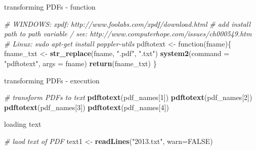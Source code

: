 \documentclass[ignorenonframetext,]{beamer}
\newenvironment{Shaded}{\begin{snugshade}}{\end{snugshade}}
\newcommand{\KeywordTok}[1]{\textcolor[rgb]{0.13,0.29,0.53}{\textbf{{#1}}}}
\newcommand{\DataTypeTok}[1]{\textcolor[rgb]{0.13,0.29,0.53}{{#1}}}
\newcommand{\DecValTok}[1]{\textcolor[rgb]{0.00,0.00,0.81}{{#1}}}
\newcommand{\StringTok}[1]{\textcolor[rgb]{0.31,0.60,0.02}{{#1}}}
\newcommand{\CommentTok}[1]{\textcolor[rgb]{0.56,0.35,0.01}{\textit{{#1}}}}
\newcommand{\OtherTok}[1]{\textcolor[rgb]{0.56,0.35,0.01}{{#1}}}
\newcommand{\NormalTok}[1]{{#1}}
\begin{document}
\begin{frame}[fragile]{transforming PDFs - function}

\begin{Shaded}
\begin{Highlighting}[]
\CommentTok{# WINDOWS: xpdf: http://www.foolabs.com/xpdf/download.html }
\CommentTok{#   add install path to path variable / see: http://www.computerhope.com/issues/ch000549.htm}
\CommentTok{# Linux: sudo apt-get install poppler-utils}
\NormalTok{pdftotext <-}\StringTok{ }\NormalTok{function(fname)\{}
  \NormalTok{fname_txt <-}\StringTok{ }\KeywordTok{str_replace}\NormalTok{(fname, }\StringTok{".pdf"}\NormalTok{, }\StringTok{".txt"}\NormalTok{)}
  \KeywordTok{system2}\NormalTok{(}\DataTypeTok{command =} \StringTok{"pdftotext"}\NormalTok{, }\DataTypeTok{args =} \NormalTok{fname)}
  \KeywordTok{return}\NormalTok{(fname_txt)}
\NormalTok{\}}
\end{Highlighting}
\end{Shaded}

\end{frame}

\begin{frame}[fragile]{transforming PDFs - execution}

\begin{Shaded}
\begin{Highlighting}[]
\CommentTok{# transform PDFs to text}
\KeywordTok{pdftotext}\NormalTok{(pdf_names[}\DecValTok{1}\NormalTok{])}
\KeywordTok{pdftotext}\NormalTok{(pdf_names[}\DecValTok{2}\NormalTok{])}
\KeywordTok{pdftotext}\NormalTok{(pdf_names[}\DecValTok{3}\NormalTok{])}
\KeywordTok{pdftotext}\NormalTok{(pdf_names[}\DecValTok{4}\NormalTok{])}
\end{Highlighting}
\end{Shaded}

\end{frame}

\begin{frame}[fragile]{loading text}

\begin{Shaded}
\begin{Highlighting}[]
\CommentTok{# laod text of PDF}
\NormalTok{text1 <-}\StringTok{ }\KeywordTok{readLines}\NormalTok{(}\StringTok{"2013.txt"}\NormalTok{, }\DataTypeTok{warn=}\OtherTok{FALSE}\NormalTok{)}
\end{Highlighting}
\end{Shaded}

\end{frame}
\end{document}
